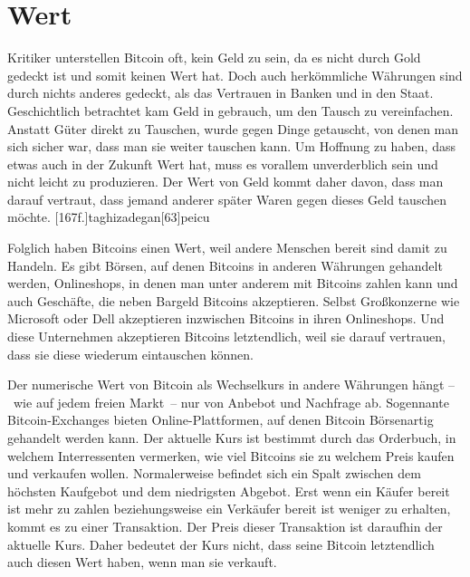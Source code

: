 \section{Wert}

Kritiker unterstellen Bitcoin oft, kein Geld zu sein, da es nicht durch Gold gedeckt ist und somit keinen Wert hat.
Doch auch herkömmliche Währungen sind durch nichts anderes gedeckt, als das Vertrauen in Banken und in den Staat.
Geschichtlich betrachtet kam Geld in gebrauch, um den Tausch zu vereinfachen.
Anstatt Güter direkt zu Tauschen, wurde gegen Dinge getauscht, von denen man sich sicher war, dass man sie weiter tauschen kann.
Um Hoffnung zu haben, dass etwas auch in der Zukunft Wert hat, muss es vorallem unverderblich sein und nicht leicht zu produzieren.
Der Wert von Geld kommt daher davon, dass man darauf vertraut, dass jemand anderer später Waren gegen dieses Geld tauschen möchte.
[167f.]{taghizadegan}[63]{peicu}

Folglich haben Bitcoins einen Wert, weil andere Menschen bereit sind damit zu Handeln.
Es gibt Börsen, auf denen Bitcoins in anderen Währungen gehandelt werden, Onlineshops, in denen man unter anderem mit Bitcoins zahlen kann und auch Geschäfte, die neben Bargeld Bitcoins akzeptieren.
Selbst Großkonzerne wie Microsoft oder Dell akzeptieren inzwischen Bitcoins in ihren Onlineshops.
Und diese Unternehmen akzeptieren Bitcoins letztendlich, weil sie darauf vertrauen, dass sie diese wiederum eintauschen können.

Der numerische Wert von Bitcoin als Wechselkurs in andere Währungen hängt --~wie auf jedem freien Markt~-- nur von Anbebot und Nachfrage ab.
Sogennante Bitcoin-Exchanges bieten Online-Plattformen, auf denen Bitcoin Börsenartig gehandelt werden kann.
Der aktuelle Kurs ist bestimmt durch das Orderbuch, in welchem Interressenten vermerken, wie viel Bitcoins sie zu welchem Preis kaufen und verkaufen wollen.
Normalerweise befindet sich ein Spalt zwischen dem höchsten Kaufgebot und dem niedrigsten Abgebot.
Erst wenn ein Käufer bereit ist mehr zu zahlen beziehungsweise ein Verkäufer bereit ist weniger zu erhalten, kommt es zu einer Transaktion.
Der Preis dieser Transaktion ist daraufhin der aktuelle Kurs.
Daher bedeutet der Kurs nicht, dass seine Bitcoin letztendlich auch diesen Wert haben, wenn man sie verkauft.
